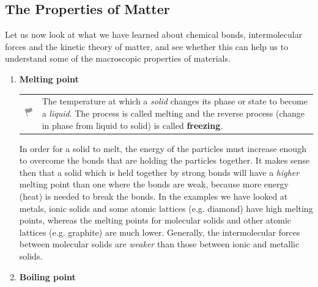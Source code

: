             \subsection{ The Properties of Matter }
            \nopagebreak
            \label{m38734*id309103}Let us now look at what we have learned about chemical 
bonds, intermolecular forces and the kinetic theory of matter, and see whether 
this can help us to understand some of the macroscopic properties of materials.
\par 
      \label{m38734*id309108}\begin{enumerate}[noitemsep, label=\textbf{\arabic*}. ] 
            \label{m38734*uid43}\item \textbf{Melting point}
\par
            \label{m38734*fhsst!!!underscore!!!id276}\begin{definition}
	  \begin{tabular*}{15 cm}{m{15 mm}m{}}
	\hspace*{-50pt}  \includegraphics[width=0.5in]{col11305.imgs/psflag2.png}   & \Definition{   \label{id2412224}\textbf{ Melting point }} { \label{m38734*meaningfhsst!!!underscore!!!id276}
The temperature at which a \textsl{solid} changes 
its phase or state to become a \textsl{liquid}. The 
process is called melting and the reverse process (change in phase from liquid 
to solid) is called \textbf{freezing}. 
 } 
      \end{tabular*}
      \end{definition}
In order for a solid to melt, the energy of the particles 
must increase enough to overcome the bonds that are holding the particles 
together. It makes sense then that a solid which is held together by strong 
bonds will have a \textsl{higher} melting point 
than one where the bonds are weak, because more energy (heat) is needed to break 
the bonds. In the examples we have looked at metals, ionic solids and some 
atomic lattices (e.g. diamond) have high melting points, whereas the melting 
points for molecular solids and other atomic lattices (e.g. graphite) are much 
lower. Generally, the intermolecular forces between molecular solids are 
\textsl{weaker} than those between ionic and 
metallic solids.
\label{m38734*uid44}\item \textbf{Boiling point}
\par

\end{enumerate}
